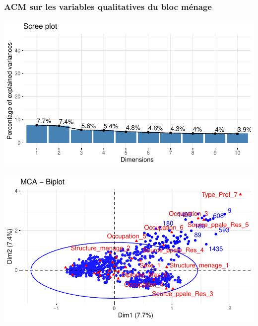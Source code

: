 \documentclass[11pt,a4paper, x11names]{article}\usepackage[]{graphicx}\usepackage[]{color}
\makeatletter
\def\maxwidth{ %
  \ifdim\Gin@nat@width>\linewidth
    \linewidth
  \else
    \Gin@nat@width
  \fi
}
\newenvironment{knitrout}{}{} %
\makeatother
\begin{document}
\subsubsection{ACM sur les variables qualitatives du bloc ménage}
\begin{minipage}{0.49\linewidth}
\begin{mdframed}
\begin{knitrout}
\color{fgcolor}
\includegraphics[width=\maxwidth]{figure/unnamed-chunk-4-1} 
\end{knitrout}
\end{mdframed}
\end{minipage}
\hfill
\begin{minipage}{0.49\linewidth}
\begin{mdframed}
\begin{knitrout}
\color{fgcolor}
\includegraphics[width=\maxwidth]{figure/unnamed-chunk-5-1} 
\end{knitrout}
\end{mdframed}
\end{minipage}
\end{document}
